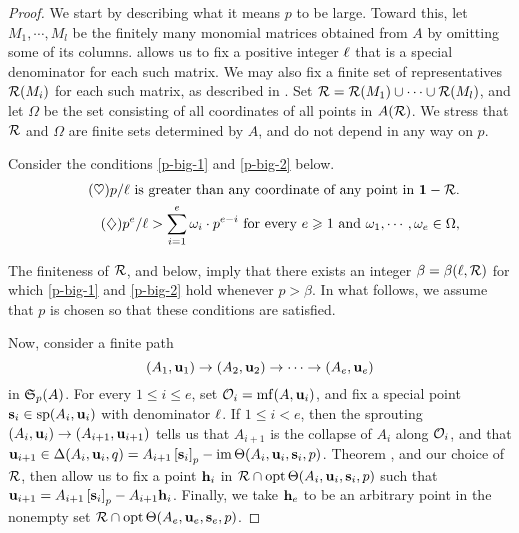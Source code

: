 \documentclass[11pt]{amsart}
\begin{document}
\begin{proof}  We start by describing what it means $p$ to be large.  Toward this, let $M_1, \cdots, M_l$ be the finitely many monomial matrices obtained from $A$ by omitting some of its columns.   allows us to fix a positive integer $\ell$ that is a special denominator for each such matrix.  We may also fix a finite set of representatives $\mathcal{R}(M_i)$ for each such matrix, as described in .  Set $\mathcal{R} = \mathcal{R}(M_1) \cup \cdots \cup \mathcal{R}(M_l)$, and let $\Omega$ be the set consisting of all coordinates of all points in $A(\mathcal{R})$.  We stress that $\mathcal{R}$ and $\Omega$ are finite sets determined by $A$, and do not depend in any way on $p$.

Consider the conditions \eqref{p-big-1} and \eqref{p-big-2} below.
%
\begin{align}
\tag{$\heartsuit$} \label{p-big-1}
\text{$p/\ell$ is greater than any coordinate of any point in $\mathbf{1} - \mathcal{R}$.} \\
 \label{p-big-2}
\tag{$\diamondsuit$}\text{$p^e / \ell > \sum_{i=1}^e \omega_i \cdot p^{e-i}$ for every $e \geqslant 1$ and $\omega_1, \cdots, \omega_e \in \Omega$,}
\end{align}

The finiteness of $\mathcal{R}$,  and  below, imply that there exists an integer $\beta = \beta(\ell, \mathcal{R})$ for which \eqref{p-big-1} and \eqref{p-big-2} hold whenever $p > \beta$.  In what follows, we assume that $p$ is chosen so that these conditions are satisfied.

Now, consider a finite path \[ (A_1, \mathbf{u}_1) \to (A_2, \mathbf{u}_2) \to \cdots \to (A_e, \mathbf{u}_e) \] in $\mathfrak{S}_p(A)$.  For every $1 \leq i \leq e$, set $\mathcal{O}_i = \operatorname{mf}(A, \mathbf{u}_i)$, and fix a special point $\mathbf{s}_i \in \operatorname{sp}(A_i, \mathbf{u}_i)$ with denominator $\ell$.  If $1 \leq i < e$, then the sprouting $(A_i, \mathbf{u}_i) \to (A_{i+1}, \mathbf{u}_{i+1})$ tells us that $A_{i+1}$ is the collapse of $A_i$ along $\mathcal{O}_i$, and that $\mathbf{u}_{i+1} \in \Delta(A_i, \mathbf{u}_i, q) = A_{i+1} \left[ \mathbf{s}_i \right]_p - \operatorname{im}  \Theta( A_i, \mathbf{u}_i, \mathbf{s}_i, p)$.  Theorem , and our choice of $\mathcal{R}$, then allow us to fix a point $\mathbf{h}_i$ in $\mathcal{R} \cap \operatorname{opt} \Theta ( A_i, \mathbf{u}_i, \mathbf{s}_i, p)$ such that
$\mathbf{u}_{i+1} = A_{i+1} \left[ \mathbf{s}_i \right]_p - A_{i+1} \mathbf{h}_i$.  Finally, we take $\mathbf{h}_e$ to be an arbitrary point in the nonempty set $\mathcal{R} \cap \operatorname{opt} \Theta ( A_e, \mathbf{u}_e, \mathbf{s}_e, p)$.



\end{proof}
\end{document}
